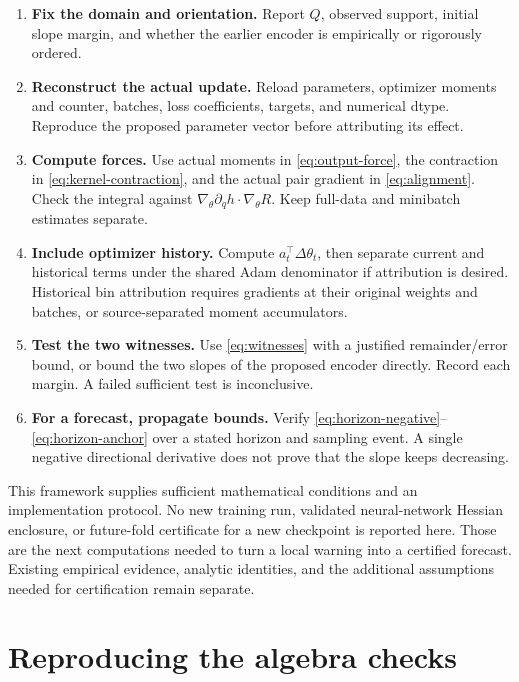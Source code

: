 \documentclass[11pt]{article}
\providecommand{\tightlist}{\setlength{\itemsep}{3pt}\setlength{\parskip}{0pt}}
\begin{document}
\begin{enumerate}
\def\labelenumi{\arabic{enumi}.}
\tightlist
\item
  \textbf{Fix the domain and orientation.} Report \(Q\), observed
  support, initial slope margin, and whether the earlier encoder is
  empirically or rigorously ordered.
\item
  \textbf{Reconstruct the actual update.} Reload parameters, optimizer
  moments and counter, batches, loss coefficients, targets, and
  numerical dtype. Reproduce the proposed parameter vector before
  attributing its effect.
\item
  \textbf{Compute forces.} Use actual moments in \eqref{eq:output-force}, the contraction in
  \eqref{eq:kernel-contraction}, and the actual pair gradient in \eqref{eq:alignment}. Check the integral against
  \(\nabla_\theta\partial_qh\cdot\nabla_\theta R\). Keep full-data and
  minibatch estimates separate.
\item
  \textbf{Include optimizer history.} Compute
  \(a_t^\top\Delta\theta_t\), then separate current and historical terms
  under the shared Adam denominator if attribution is desired.
  Historical bin attribution requires gradients at their original
  weights and batches, or source-separated moment accumulators.
\item
  \textbf{Test the two witnesses.} Use \eqref{eq:witnesses} with a justified
  remainder/error bound, or bound the two slopes of the proposed encoder
  directly. Record each margin. A failed sufficient test is
  inconclusive.
\item
  \textbf{For a forecast, propagate bounds.} Verify \eqref{eq:horizon-negative}--\eqref{eq:horizon-anchor} over a
  stated horizon and sampling event. A single negative directional
  derivative does not prove that the slope keeps decreasing.
\end{enumerate}

This framework supplies sufficient mathematical conditions and an
implementation protocol. No new training run, validated neural-network
Hessian enclosure, or future-fold certificate for a new checkpoint is
reported here. Those are the next computations needed to turn a local
warning into a certified forecast. Existing empirical evidence, analytic
identities, and the additional assumptions needed for certification
remain separate.

\section{Reproducing the algebra
checks}\label{reproducing-the-algebra-checks}
\end{document}
